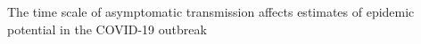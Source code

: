 
The time scale of asymptomatic transmission affects estimates of epidemic potential in the COVID-19 outbreak
